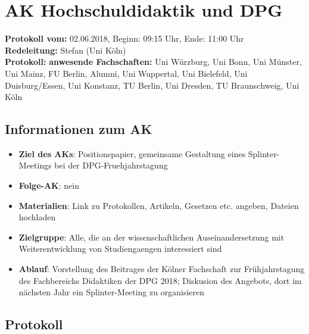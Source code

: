 
\section{AK Hochschuldidaktik und DPG}

  \textbf{Protokoll vom:} 02.06.2018, %
  Beginn: 09:15 Uhr,
  Ende: 11:00 Uhr \\
  \textbf{Redeleitung:} Stefan (Uni Köln) \\ %
  \textbf{Protokoll:} %
  \textbf{anwesende Fachschaften:} Uni Würzburg, Uni Bonn, Uni Münster, Uni Mainz, FU Berlin, Alumni, Uni Wuppertal, Uni Bielefeld, Uni Duisburg/Essen, Uni Konstanz, TU Berlin, Uni Dresden, TU Braunschweig, Uni Köln

  \subsection*{Informationen zum AK}
    \begin{itemize}
      \item \textbf{Ziel des AKs}: Positionspapier, gemeinsame Gestaltung eines Splinter-Meetings bei der DPG-Fruehjahrstagung
      \item \textbf{Folge-AK}: nein
      \item \textbf{Materialien}: Link zu Protokollen, Artikeln, Gesetzen etc. angeben, Dateien hochladen
      \item \textbf{Zielgruppe}: Alle, die an der wissenschaftlichen Auseinandersetzung mit Weiterentwicklung von Studiengaengen interessiert sind
      \item \textbf{Ablauf}: Vorstellung des Beitrages der Kölner Fachschaft zur Frühjahrstagung des Fachbereichs Didaktiken der DPG 2018; Diskusion des Angebots, dort im nächsten Jahr ein Splinter-Meeting zu organisieren
    \end{itemize}

    \subsection*{Protokoll}
